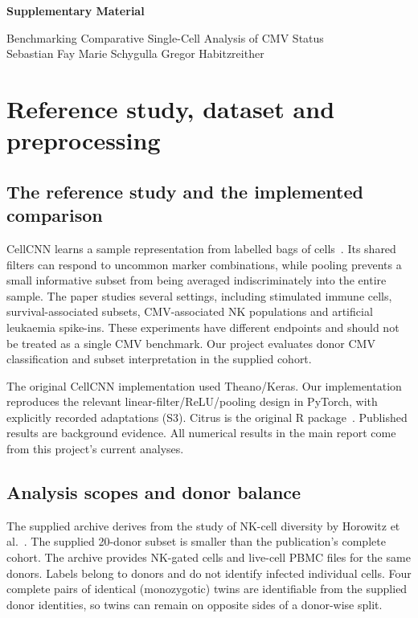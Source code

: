 \documentclass[11pt,a4paper]{article}
\begin{document}
\begin{center}
{\Large\bfseries Supplementary Material\par}
\vspace{3pt}
Benchmarking Comparative Single-Cell Analysis of CMV Status\\
Sebastian Fay \quad Marie Schygulla \quad Gregor Habitzreither
\end{center}

\section{Reference study, dataset and preprocessing}
\subsection{The reference study and the implemented comparison}
CellCNN learns a sample representation from labelled bags of cells~\cite{cellcnn}. Its shared filters can respond to uncommon marker combinations, while pooling prevents a small informative subset from being averaged indiscriminately into the entire sample. The paper studies several settings, including stimulated immune cells, survival-associated subsets, CMV-associated NK populations and artificial leukaemia spike-ins. These experiments have different endpoints and should not be treated as a single CMV benchmark. Our project evaluates donor CMV classification and subset interpretation in the supplied cohort.

The original CellCNN implementation used Theano/Keras. Our implementation reproduces the relevant linear-filter/ReLU/pooling design in PyTorch, with explicitly recorded adaptations (S3). Citrus is the original R package~\cite{citrus}. Published results are background evidence. All numerical results in the main report come from this project's current analyses.

\subsection{Analysis scopes and donor balance}
The supplied archive derives from the study of NK-cell diversity by Horowitz et al.~\cite{horowitz}. The supplied 20-donor subset is smaller than the publication's complete cohort. The archive provides NK-gated cells and live-cell PBMC files for the same donors. Labels belong to donors and do not identify infected individual cells. Four complete pairs of identical (monozygotic) twins are identifiable from the supplied donor identities, so twins can remain on opposite sides of a donor-wise split.
\end{document}
